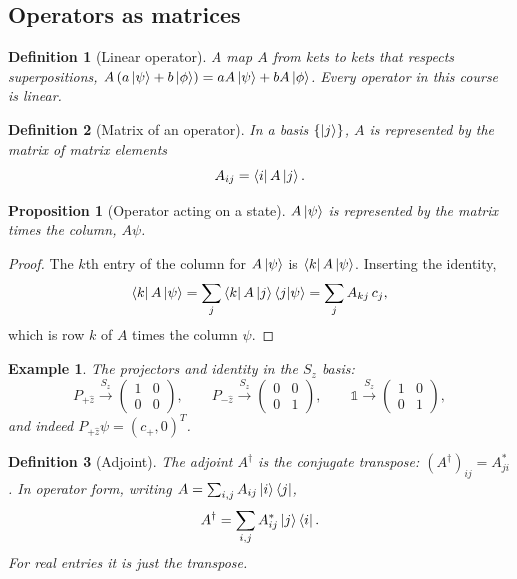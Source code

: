 \documentclass{article}
\newtheorem{definition}{Definition}
\newtheorem*{example}{Example}
\newtheorem{proposition}{Proposition}
\newcommand{\id}{\mathds{1}}
\begin{document}
\subsection{Operators as matrices}
\begin{definition}[Linear operator]
    A map $A$ from kets to kets that respects superpositions, $A\left(a\ket{\psi} + b\ket{\phi}\right) = aA\ket{\psi} + bA\ket{\phi}$. Every operator in this course is linear.
\end{definition}
\begin{definition}[Matrix of an operator]
    In a basis $\{\ket{j}\}$, $A$ is represented by the matrix of \emph{matrix elements}
    \begin{equation}
        A_{ij} = \bra{i}A\ket{j}.
    \end{equation}
\end{definition}
\begin{proposition}[Operator acting on a state]
    $A\ket{\psi}$ is represented by the matrix times the column, $A\psi$.
\end{proposition}
\begin{proof}
    The $k$th entry of the column for $A\ket{\psi}$ is $\bra{k}A\ket{\psi}$. Inserting the identity,
    \[\bra{k}A\ket{\psi} = \sum_j\bra{k}A\ket{j}\braket{j|\psi} = \sum_j A_{kj}\,c_j,\]
    which is row $k$ of $A$ times the column $\psi$.
\end{proof}
\begin{example}
    The projectors and identity in the $S_z$ basis:
    \[P_{+\hat{z}} \xrightarrow{S_z} \begin{pmatrix} 1 & 0 \\ 0 & 0 \end{pmatrix}, \qquad P_{-\hat{z}} \xrightarrow{S_z} \begin{pmatrix} 0 & 0 \\ 0 & 1 \end{pmatrix}, \qquad \id \xrightarrow{S_z} \begin{pmatrix} 1 & 0 \\ 0 & 1 \end{pmatrix},\]
    and indeed $P_{+\hat{z}}\psi = (c_+, 0)^T$.
\end{example}
\begin{definition}[Adjoint]
    The adjoint $A^\dagger$ is the conjugate transpose: $(A^\dagger)_{ij} = A_{ji}^*$. In operator form, writing $A = \sum_{i,j}A_{ij}\ket{i}\bra{j}$,
    \begin{equation}
        A^\dagger = \sum_{i,j}A_{ij}^*\ket{j}\bra{i}.
    \end{equation}
    For real entries it is just the transpose.
\end{definition}
\end{document}
